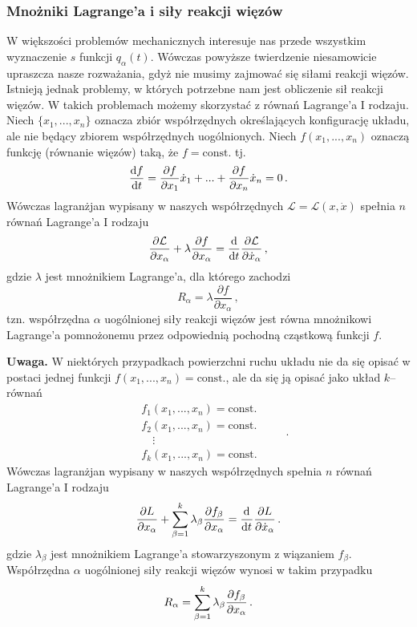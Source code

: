 \documentclass[../main.tex]{subfiles}
\begin{document}
\subsubsection{Mnożniki Lagrange'a i siły reakcji więzów}
W większości problemów mechanicznych interesuje nas przede wszystkim wyznaczenie \(s\) funkcji
\(q_\alpha(t)\). Wówczas powyższe twierdzenie niesamowicie upraszcza nasze rozważania, gdyż nie
musimy zajmować się siłami reakcji więzów. Istnieją jednak problemy, w których potrzebne nam jest
obliczenie sił reakcji więzów. W takich problemach możemy skorzystać z równań Lagrange'a I rodzaju.
Niech \(\{x_1,...,x_n\}\) oznacza zbiór współrzędnych określających konfigurację układu, ale nie
będący zbiorem współrzędnych uogólnionych. Niech \(f(x_1,...,x_n)\) oznaczą funkcję (równanie
więzów) taką, że \(f=\text{const.}\) tj.
\begin{equation*}
    \dv{f}{t}=\frac{\partial f}{\partial x_1}\dot x_1+...+\frac{\partial f}{\partial x_n}\dot x_n=0\,.
\end{equation*}
Wówczas lagranżjan wypisany w naszych współrzędnych \(\mathcal{L}=\mathcal{L}(x,\dot x)\) spełnia
\(n\) równań Lagrange'a I rodzaju
\begin{equation*}
    \frac{\partial\mathcal{L}}{\partial x_\alpha}+\lambda \frac{\partial f}{\partial x_\alpha}=\dv{}{t}\frac{\partial \mathcal{L}}{\partial \dot{x}_\alpha}\,,
\end{equation*}
gdzie \(\lambda\) jest mnożnikiem Lagrange'a, dla którego zachodzi
\begin{equation*}
    R_\alpha=\lambda\frac{\partial f}{\partial x_\alpha}\,,
\end{equation*}
tzn. współrzędna \(\alpha\) uogólnionej siły reakcji więzów jest równa mnożnikowi Lagrange'a
pomnożonemu przez odpowiednią pochodną cząstkową funkcji \(f\).
\medskip

\textbf{Uwaga.} W niektórych przypadkach powierzchni ruchu układu nie da się opisać w postaci jednej
funkcji \(f(x_1,...,x_n)=\text{const.}\), ale da się ją opisać jako układ \(k\)--równań
\begin{equation*}
    \begin{split}
        &f_1(x_1,...,x_n)=\text{const.}\\
        &f_2(x_1,...,x_n)=\text{const.}\\
        &\quad\vdots\\
        &f_k(x_1,...,x_n)=\text{const.}
    \end{split}\quad\quad\,.
\end{equation*}
Wówczas lagranżjan wypisany w naszych współrzędnych spełnia \(n\) równań Lagrange'a I rodzaju
\begin{equation*}
    \pdv{L}{x_\alpha}+\sum_{\beta=1}^k\lambda_\beta\pdv{f_\beta}{x_\alpha}=\dv[]{}{t}\pdv{L}{\dot{x}_\alpha}\,.
\end{equation*}
gdzie \(\lambda_\beta\) jest mnożnikiem Lagrange'a stowarzyszonym z wiązaniem \(f_\beta\).
Współrzędna \(\alpha\) uogólnionej siły reakcji więzów wynosi w takim przypadku
\begin{equation*}
    R_\alpha=\sum_{\beta=1}^k\lambda_\beta\pdv{f_\beta}{x_\alpha}\,.
\end{equation*}
\end{document}
